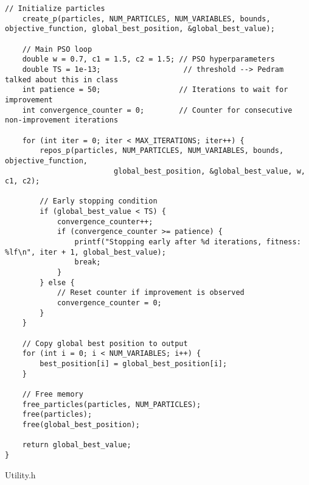 \documentclass[12pt]{article}
\begin{document}
\begin{lstlisting}[basicstyle=\small]
    // Initialize particles
    create_p(particles, NUM_PARTICLES, NUM_VARIABLES, bounds, objective_function, global_best_position, &global_best_value);

    // Main PSO loop
    double w = 0.7, c1 = 1.5, c2 = 1.5; // PSO hyperparameters
    double TS = 1e-13;                   // threshold --> Pedram talked about this in class
    int patience = 50;                  // Iterations to wait for improvement
    int convergence_counter = 0;        // Counter for consecutive non-improvement iterations

    for (int iter = 0; iter < MAX_ITERATIONS; iter++) {
        repos_p(particles, NUM_PARTICLES, NUM_VARIABLES, bounds, objective_function,
                         global_best_position, &global_best_value, w, c1, c2);

        // Early stopping condition
        if (global_best_value < TS) {
            convergence_counter++;
            if (convergence_counter >= patience) {
                printf("Stopping early after %d iterations, fitness: %lf\n", iter + 1, global_best_value);
                break;
            }
        } else {
            // Reset counter if improvement is observed
            convergence_counter = 0;
        }
    }

    // Copy global best position to output
    for (int i = 0; i < NUM_VARIABLES; i++) {
        best_position[i] = global_best_position[i];
    }

    // Free memory
    free_particles(particles, NUM_PARTICLES);
    free(particles);
    free(global_best_position);

    return global_best_value;
}

	\end{lstlisting}
\newpage	
	Utility.h
\end{document}
